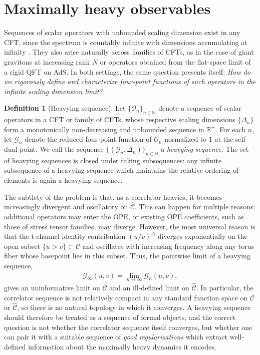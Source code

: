 \documentclass[a4paper,11pt]{article}
\theoremstyle{plain}
\theoremstyle{definition}
\newtheorem{defn}{Definition}[section]
\theoremstyle{remark}
\newcommand{\cO}{\mathcal O}
\newcommand{\ba}{\begin{equation} \begin{aligned}}
\newcommand{\ea}{\end{aligned} \end{equation}}
\newcommand{\De}{\Delta}
\begin{document}
\section{Maximally heavy observables}
\label{maxheavy}
 
Sequences of scalar operators with unbounded scaling dimension exist in any CFT, since the spectrum is countably infinite with dimensions accumulating at infinity \cite{Qiao:2017xif,Mukhametzhanov:2018zja}. They also arise naturally across families of CFTs, as in the case of giant gravitons at increasing rank $N$ or operators obtained from the flat-space limit of a rigid QFT on AdS. In both settings, the same question presents itself: \textit{How do we rigorously define and characterize four-point functions of such operators in the infinite scaling dimension limit?}
 
\begin{defn}[Heavying sequence]
\label{heavyingsequence}
Let $\{\cO_n\}_{n \in \mathbb{N}}$ denote a sequence of scalar operators in a CFT or family of CFTs, whose respective scaling dimensions $\{\De_n\}$ form a monotonically non-decreasing and unbounded sequence in $\mathbb{R}^+$. For each $n$, let $\mathcal{G}_n$ denote the reduced four-point function of $\cO_n$ normalized to $1$ at the self-dual point. We call the sequence $\{(\mathcal{G}_n, \De_n)\}_{n \in \mathbb{N}}$ a \textit{heavying sequence}. The set of heavying sequences is closed under taking subsequences: any infinite subsequence of a heavying sequence which maintains the relative ordering of elements is again a heavying sequence.
\end{defn}

\noindent The subtlety of the problem is that, as a correlator heavies, it becomes increasingly divergent and oscillatory on $\widehat{\mathscr{C}}$. This can happen for multiple reasons: additional operators may enter the OPE, or existing OPE coefficients, such as those of stress tensor families, may diverge. However, the most universal reason is that the t-channel identity contribution $(u/v)^\De$ diverges exponentially on the open subset $\{u>v\} \subset \mathscr{C}$ and oscillates with increasing frequency along any torus fiber whose basepoint lies in this subset. Thus, the pointwise limit of a heavying sequence,
\ba
\mathcal{G}_\infty(u,v) = \lim_{n \to \infty} \mathcal{G}_n(u,v),
\ea
gives an uninformative limit on $\mathscr{C}$ and an ill-defined limit on $\widehat{\mathscr{C}}$. In particular, the correlator sequence is not relatively compact in any standard function space on $\mathscr{C}$ or $\widehat{\mathscr{C}}$, so there is no natural topology in which it converges. A heavying sequence should therefore be treated as a sequence of formal objects, and the correct question is not whether the correlator sequence itself converges, but whether one can pair it with a suitable sequence of \textit{good regularizations} which extract well-defined information about the maximally heavy dynamics it encodes. 
 
\end{document}
